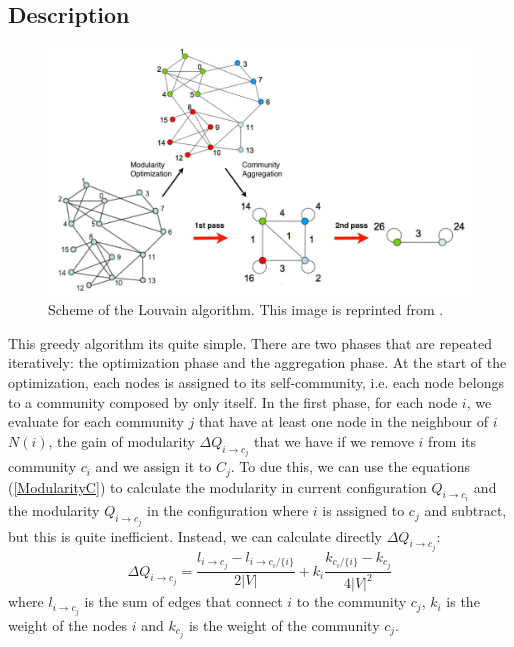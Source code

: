 \subsection{Description}
\begin{figure}
	\centering
	\hspace*{-1em}
	\includegraphics[width=1\linewidth]{0-resources/blondel_scheme}
	\caption{Scheme of the Louvain algorithm. This image is reprinted from \cite{Blondel_2008}.}
	\label{fig:blondelscheme}
\end{figure}
This greedy algorithm its quite simple. There are two phases that are repeated iteratively: the optimization phase and the aggregation phase. At the start of the optimization, each nodes is assigned to its self-community, i.e. each node belongs to a community composed by only itself. 
In the first phase, for each node $i$, we evaluate for each community $j$ that have at least one node in the neighbour of $i$ $N(i)$, the gain of modularity $\Delta Q_{i \rightarrow c_j}$ that we have if we remove $i$ from its community $c_i$ and we assign it to $C_j$.
To due this, we can use the equations (\ref{ModularityC}) to calculate the modularity in current configuration $Q_{i\rightarrow c_i}$ and the modularity $Q_{i\rightarrow c_j}$ in the configuration where $i$ is assigned to $c_j$ and subtract, but this is quite inefficient. Instead, we can calculate directly  $\Delta Q_{i \rightarrow c_j}$:
\begin{equation}
\Delta Q_{i \rightarrow c_j} = \frac{l_{i\rightarrow c_j} - l_{i\rightarrow c_i / \{i\}}}{2|V|} + k_i \frac{k_{c_i / \{i\}} - k_{c_j}}{4|V|^2}
\end{equation}
where $l_{i\rightarrow c_j}$ is the sum of edges that connect $i$ to the community $c_j$, $k_i$ is the weight of the nodes $i$ and $k_{c_j}$ is the weight of the community $c_j$.
